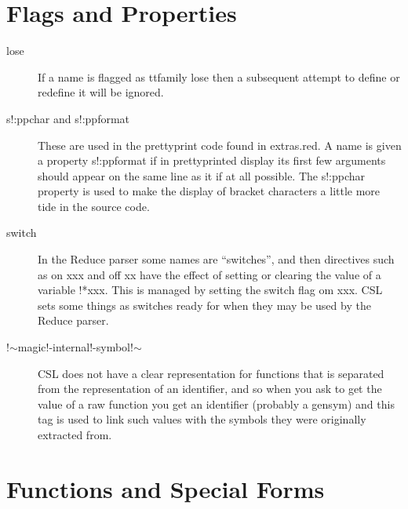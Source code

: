 \documentclass[a4paper,11pt]{article}
\begin{document}
\section{Flags and Properties}
\begin{description}

\item [{\ttfamily lose}]
If a name is flagged as {ttfamily lose} then a subsequent attempt to
define or redefine it will be ignored.

\item [{\ttfamily s!:ppchar} and {\ttfamily s!:ppformat}]
These are used in the prettyprint code found in {\ttfamily extras.red}. A
name is given a property {\ttfamily s!:ppformat} if in prettyprinted display
its first few arguments should appear on the same line as it if at all
possible. The {\ttfamily s!:ppchar} property is used to make the display of
bracket characters a little more tide in the source code.

\item [{\ttfamily switch}]
In the Reduce parser some names are ``switches'', and then directives such
as {\ttfamily on xxx} and {\ttfamily off xx} have the effect of setting or
clearing the value of a variable {\ttfamily !*xxx}. This is managed by
setting the {\ttfamily switch} flag om {\ttfamily xxx}. CSL sets some
things as switches ready for when they may be used by the Reduce parser.

\item [{\ttfamily !$\sim$magic!-internal!-symbol!$\sim$}]
CSL does not have a clear representation for functions that is separated from
the representation of an identifier, and so when you ask to get the value
of a raw function you get an identifier (probably a gensym) and this
tag is used to link such values with the symbols they were originally
extracted from.

\end{description}

\section{Functions and Special Forms}
  
\end{document}

